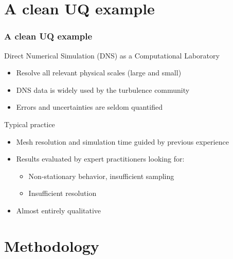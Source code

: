 \documentclass[mathserif]{beamer}
\begin{document}
\section{A clean UQ example}

\begin{frame}
\frametitle{A clean UQ example}

 \begin{block}{Direct Numerical Simulation (DNS) as a Computational Laboratory}
  \begin{itemize}
   \item Resolve all relevant physical scales (large and small)
   \item DNS data is widely used by the turbulence community
   \item Errors and uncertainties are seldom quantified 
 \end{itemize}

 \end{block}

 \begin{block}{Typical practice}
  \begin{itemize}
  \item Mesh resolution and simulation time guided by previous experience
  \item Results evaluated by expert practitioners looking for:
    \begin{itemize}
    \item Non-stationary behavior, insufficient sampling
    \item Insufficient resolution
    \end{itemize}
  \item Almost entirely qualitative
  \end{itemize}
\end{block}

\end{frame}

\section{Methodology}
\end{document}
